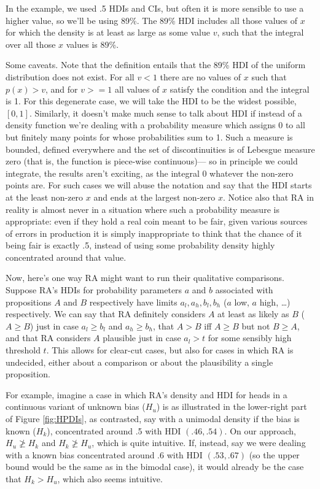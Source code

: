 \documentclass[
  10pt,
  dvipsnames,enabledeprecatedfontcommands]{scrartcl}
\begin{document}
In the example, we used .5 HDIs and CIs, but often it is more sensible
to use a higher value, so we'll be using 89\%. The 89\% HDI includes all
those values of \(x\) for which the density is at least as large as some
value \(v\), such that the integral over all those \(x\) values is 89\%.

Some caveats. Note that the definition entails that the 89\% HDI of the
uniform distribution does not exist. For all \(v<1\) there are no values
of \(x\) such that \(p(x)>v\), and for \(v>=1\) all values of \(x\)
satisfy the condition and the integral is 1. For this degenerate case,
we will take the HDI to be the widest possible, \([0,1]\). Similarly, it
doesn't make much sense to talk about HDI if instead of a density
function we're dealing with a probability measure which assigns 0 to all
but finitely many points for whose probabilities sum to 1. Such a
measure is bounded, defined everywhere and the set of discontinuities is
of Lebesgue measure zero (that is, the function is piece-wise
continuous)--- so in principle we could integrate, the results aren't
exciting, as the integral 0 whatever the non-zero points are. For such
cases we will abuse the notation and say that the HDI starts at the
least non-zero \(x\) and ends at the largest non-zero \(x\). Notice also
that RA in reality is almost never in a situation where such a
probability measure is appropriate: even if they hold a real coin meant
to be fair, given various sources of errors in production it is simply
inappropriate to think that the chance of it being fair is exactly .5,
instead of using some probability density highly concentrated around
that value.

Now, here's one way RA might want to run their qualitative comparisons.
Suppose RA's HDIs for probability parameters \(a\) and \(b\) associated
with propositions \(A\) and \(B\) respectively have limits
\(a_l, a_h, b_l, b_h\) (\(a\) low, \(a\) high, \dots) respectively. We
can say that RA definitely considers \(A\) at least as likely as \(B\)
(\(A\geq B\)) just in case \(a_l\geq b_l\) and \(a_h \geq b_h\), that
\(A>B\) iff \(A\geq B\) but not \(B \geq A\), and that RA considers
\(A\) plausible just in case \(a_l>t\) for some sensibly high threshold
\(t\). This allows for clear-cut cases, but also for cases in which RA
is undecided, either about a comparison or about the plausibility a
single proposition.

For example, imagine a case in which RA's density and HDI for heads in a
continuous variant of unknown bias (\(H_u\)) is as illustrated in the
lower-right part of Figure \ref{fig:HPDIs}, as contrasted, say with a
unimodal density if the bias is known (\(H_k\)), concentrated around .5
with HDI \((.46,.54)\). On our approach, \(H_u \not \geq H_k\) and
\(H_k \not \geq H_u\), which is quite intuitive. If, instead, say we
were dealing with a known bias concentrated around .6 with HDI
\((.53,.67)\) (so the upper bound would be the same as in the bimodal
case), it would already be the case that \(H_k> H_u\), which also seems
intuitive.
\end{document}
